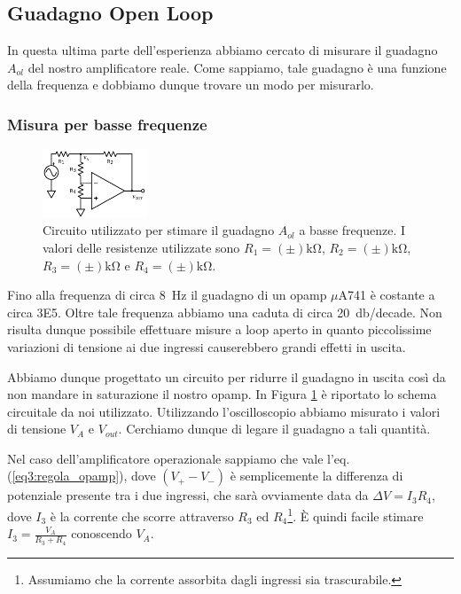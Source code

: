 \subsection{Guadagno Open Loop}

In questa ultima parte dell'esperienza abbiamo cercato di misurare il guadagno $A_{ol}$ del nostro amplificatore reale.
Come sappiamo, tale guadagno è una funzione della frequenza e dobbiamo dunque trovare un modo per misurarlo.

\subsubsection{Misura per basse frequenze}

\begin{figure}
  \begin{center}
    \includegraphics[width=0.280\textwidth]{../E03/latex/LF_ol.pdf}
  \end{center}
  \caption{Circuito utilizzato per stimare il guadagno $A_{ol}$ a basse frequenze. I valori delle resistenze utilizzate sono $R_1 = (\pm) \si{\kilo\ohm}$, $R_2 = (\pm) \si{\kilo\ohm}$, $R_3 = (\pm) \si{\kilo\ohm}$ e $R_4 = (\pm) \si{\kilo\ohm}$.}
  \label{cir3:low_frequency}
\end{figure}

Fino alla frequenza di circa \SI{8}{\hertz} il guadagno di un opamp $\mu$A741 è costante a circa \num{3E5}.
Oltre tale frequenza abbiamo una caduta di circa \SI{20}{\decibel}/decade.
Non risulta dunque possibile effettuare misure a loop aperto in quanto piccolissime variazioni di tensione ai due ingressi causerebbero grandi effetti in uscita.

Abbiamo dunque progettato un circuito per ridurre il guadagno in uscita così da non mandare in saturazione il nostro opamp.
In Figura \ref{cir3:low_frequency} è riportato lo schema circuitale da noi utilizzato.
Utilizzando l'oscilloscopio abbiamo misurato i valori di tensione $V_A$ e $V_{out}$. Cerchiamo dunque di legare il guadagno a tali quantità.

Nel caso dell'amplificatore operazionale sappiamo che vale l'eq. (\ref{eq3:regola_opamp}), dove $(V_+-V_-)$ è semplicemente la differenza di potenziale presente tra i due ingressi, che sarà ovviamente data da $\Delta V = I_3R_4$, dove $I_3$ è la corrente che scorre attraverso $R_3$ ed $R_4$\footnote{Assumiamo che la corrente assorbita dagli ingressi sia trascurabile.}.
È quindi facile stimare $I_3=\frac{V_A}{R_3+R_4}$ conoscendo $V_A$.

